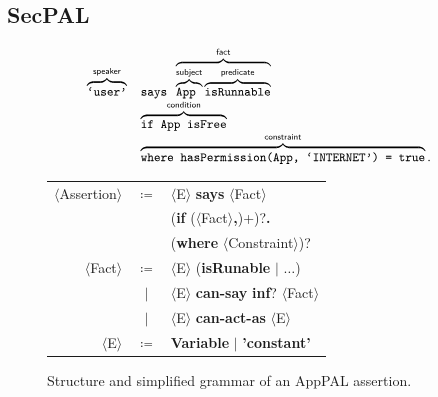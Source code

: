 \documentclass[thesis.tex]{subfiles}
\begin{document}
\subsection{SecPAL}
\begin{figure}
  \newcommand{\bracetext}[1]{\text{\sffamily #1}}
  \newcommand{\smalltext}[1]{\text{\ttfamily\small #1}}
  \centering
  \begin{minipage}{0.49\linewidth}
    \begin{equation*}\small
      \begin{array}{r l}\footnotesize
        \overbrace{\smalltext{`user'}}^{\bracetext{speaker}} &
        \smalltext{ says }\overbrace{\overbrace{\smalltext{ App }}^{\bracetext{subject}}\overbrace{\smalltext{ isRunnable}}^{\bracetext{predicate}}}^{\bracetext{fact}} \\
        & \overbrace{\smalltext{ if App isFree}}^{\bracetext{condition}} \\
        & \overbrace{\smalltext{ where hasPermission(App, `INTERNET') = true}}^{\bracetext{constraint}}.
      \end{array}
    \end{equation*}
  \end{minipage}
  \begin{minipage}{0.49\linewidth}
  \newcommand{\nonterminal}[1]{$\langle$#1$\rangle$}
  \newcommand{\terminal}[1]{\textbf{#1}}
  \begin{tabular}{r c l}
    \footnotesize
    \nonterminal{Assertion} & $\coloneqq$ & \nonterminal{E} \terminal{says} \nonterminal{Fact} \\
                            &             & \hspace{1em}(\terminal{if} (\nonterminal{Fact}\terminal{,})+)?\terminal{.} \\
                            &             & \hspace{1em}(\terminal{where} \nonterminal{Constraint})? \\
    \nonterminal{Fact}      & $\coloneqq$ & \nonterminal{E} (\terminal{isRunable} $\vert$ $\ldots$) \\
                            & $\vert$     & \nonterminal{E} \terminal{can-say} \terminal{inf}? \nonterminal{Fact} \\
                            & $\vert$     & \nonterminal{E} \terminal{can-act-as} \nonterminal{E} \\
    \nonterminal{E}         & $\coloneqq$ & \terminal{Variable} $\vert$ \terminal{'constant'}
  \end{tabular}
  \vspace{2em}
  \end{minipage}
  \caption{Structure and simplified grammar of an AppPAL assertion.}
  \label{fig:assertion}
\end{figure}
\end{document}
